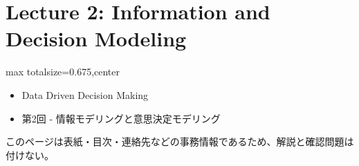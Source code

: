 \section*{Lecture 2: Information and Decision Modeling}
\clearpage
{}
\begin{adjustbox}{max totalsize={\textwidth}{0.675\textheight},center}
\begin{minipage}{\textwidth}\scriptsize
\begin{minipage}[t]{0.485\textwidth}
\begin{itemize}
\item Data Driven Decision Making
\item 第2回 - 情報モデリングと意思決定モデリング
\end{itemize}
\end{minipage}\hfill
\begin{minipage}[t]{0.485\textwidth}
{\small このページは表紙・目次・連絡先などの事務情報であるため、解説と確認問題は付けない。}
\end{minipage}
\end{minipage}
\end{adjustbox}

